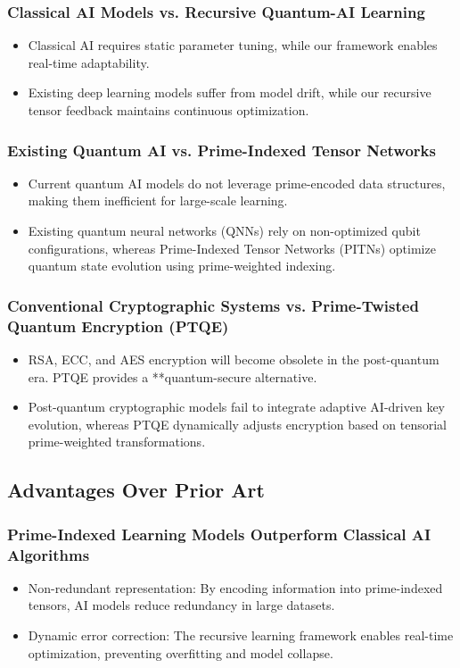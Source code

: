 \documentclass{article}
\theoremstyle{plain}
\begin{document}
\begin{itemize}
\subsubsection{Classical AI Models vs. Recursive Quantum-AI Learning}
\begin{itemize}
    \item Classical AI requires static parameter tuning, while our framework enables real-time adaptability.
    \item Existing deep learning models suffer from model drift, while our recursive tensor feedback maintains continuous optimization.
\end{itemize}

\subsubsection{Existing Quantum AI vs. Prime-Indexed Tensor Networks}
\begin{itemize}
    \item Current quantum AI models do not leverage prime-encoded data structures, making them inefficient for large-scale learning.
    \item Existing quantum neural networks (QNNs) rely on non-optimized qubit configurations, whereas Prime-Indexed Tensor Networks (PITNs) optimize quantum state evolution using prime-weighted indexing.
\end{itemize}

\subsubsection{Conventional Cryptographic Systems vs. Prime-Twisted Quantum Encryption (PTQE)}
\begin{itemize}
    \item RSA, ECC, and AES encryption will become obsolete in the post-quantum era. PTQE provides a **quantum-secure alternative.
    \item Post-quantum cryptographic models fail to integrate adaptive AI-driven key evolution, whereas PTQE dynamically adjusts encryption based on tensorial prime-weighted transformations.
\end{itemize}

\subsection{Advantages Over Prior Art}
\subsubsection{Prime-Indexed Learning Models Outperform Classical AI Algorithms}
\begin{itemize}
    \item Non-redundant representation: By encoding information into prime-indexed tensors, AI models reduce redundancy in large datasets.
    \item Dynamic error correction: The recursive learning framework enables real-time optimization, preventing overfitting and model collapse.
\end{itemize}


\end{itemize}
\end{document}
